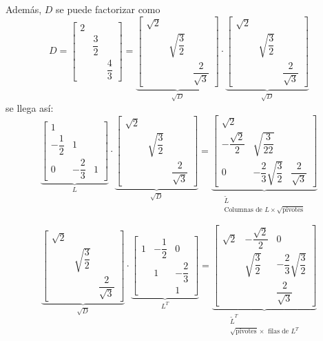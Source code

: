 \documentclass[12pt]{article}
\begin{document}
Además, $D$ se puede factorizar como \[D=\begin{bmatrix}
2 &  &  \\ 
 & \dfrac{3}{2} &  \\ 
 &  & \dfrac{4}{3}
\end{bmatrix}=\underbrace{\begin{bmatrix}
\sqrt{2} &  &  \\ 
 & \sqrt{\dfrac{3}{2}} &  \\ 
 &  & \dfrac{2}{\sqrt{3}}
\end{bmatrix} }_{\sqrt{D}}\cdot\underbrace{\begin{bmatrix}
\sqrt{2} &  &  \\ 
 & \sqrt{\dfrac{3}{2}} &  \\ 
 &  & \dfrac{2}{\sqrt{3}}
\end{bmatrix} }_{\sqrt{D}}\]
se llega así:
\[\underbrace{\begin{bmatrix}
1 &  &  \\ 
-\dfrac{1}{2} & 1 &  \\ 
0 & -\dfrac{2}{3} & 1
\end{bmatrix} }_L\cdot\underbrace{\begin{bmatrix}
\sqrt{2} &  &  \\ 
 & \sqrt{\dfrac{3}{2}} &  \\ 
 &  & \dfrac{2}{\sqrt{3}}
\end{bmatrix} }_{\sqrt{D}}=\underbrace{\begin{bmatrix}
\sqrt{2} &  &  \\ 
-\dfrac{\sqrt{2}}{2} & \sqrt{\dfrac{3}{22}} &  \\ 
0 & -\dfrac{2}{3}\sqrt{\dfrac{3}{2}} & \dfrac{2}{\sqrt{3}}
\end{bmatrix} }_{\begin{array}{c}
\tilde{L}\\
\text{Columnas de }L\times\sqrt{\text{pivotes}}
\end{array}}\]

\[\underbrace{\begin{bmatrix}
\sqrt{2} &  &  \\ 
 & \sqrt{\dfrac{3}{2}} &  \\ 
 &  & \dfrac{2}{\sqrt{3}}
\end{bmatrix} }_{\sqrt{D}}\cdot\underbrace{\begin{bmatrix}
1 & -\dfrac{1}{2} & 0 \\ 
 & 1 & -\dfrac{2}{3} \\ 
 &  & 1
\end{bmatrix} }_{L^T}=\underbrace{\begin{bmatrix}
\sqrt{2} & -\dfrac{\sqrt{2}}{2} & 0 \\ 
 & \sqrt{\dfrac{3}{2}} & -\dfrac{2}{3}\sqrt{\dfrac{3}{2}} \\ 
 &  & \dfrac{2}{\sqrt{3}}
\end{bmatrix} }_{\begin{array}{c}
\tilde{L}^T\\
\sqrt{\text{pivotes}}\times\text{ filas de }L^T
\end{array}}\]
\end{document}
